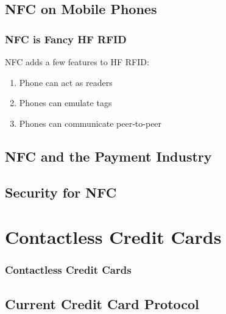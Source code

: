 \documentclass[unknownkeysallowed]{beamer}
\begin{document}
\subsection{NFC on Mobile Phones}

\begin{frame}
\frametitle{NFC is Fancy HF RFID}
  \begin{center}
  \begin{minipage}{.7\textwidth}
  \begin{block}{NFC adds a few features to HF RFID:}
		\begin{enumerate}
		  \item{Phone can act as readers}
		  \item{Phones can emulate tags}
      \item{Phones can communicate peer-to-peer}
   	\end{enumerate}
  \end{block}
  \end{minipage}
  \end{center}
\end{frame}


\subsection{NFC and the Payment Industry}
\subsection{Security for NFC}

\section{Contactless Credit Cards}
\begin{frame}
  \frametitle{Contactless Credit Cards}
    \begin{center}\begin{minipage}{.9\textwidth}
    \tableofcontents[currentsubsection, hideothersubsections, sectionstyle=show/shaded]
    \end{minipage}\end{center}
\end{frame}
%
\subsection{Current Credit Card Protocol}
\end{document}
